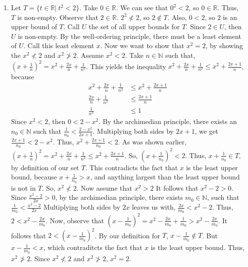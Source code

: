 \documentclass{article}
\theoremstyle{problem}
\theoremstyle{plain}
\theoremstyle{remark}
\begin{document}
\begin{enumerate}
\item %
  Let $T = \{t \in \mathbb{R}|\ t^2 < 2\}$.
  Take $0 \in \mathbb{R}$. 
  We can see that $0^2 < 2$, so $0 \in \mathbb{R}$. 
  Thus, $T$ is non-empty.
  Observe that $2 \in \mathbb{R}$.
  $2^2 \not < 2$, so $2 \not \in T$.
  Also, $0 < 2$, so $2$ is an upper bound of $T$. 
  Call $U$ the set of all upper bounds for $T$.
  Since $2 \in U$, then $U$ is non-empty.
  By the well-ordering principle, there must be a least element of $U$.
  Call this least element $x$.
  Now we want to show that $x^2 = 2$, by showing the $x^2 \not < 2$ and $x^2 \not > 2$.
  Assume $x^2 < 2$.
  Take $n \in \mathbb{N}$ such that, $(x + \frac{1}{n})^2 = x^2 + \frac{2x}{n} + \frac{1}{n^2}$.
  This yields the inequality $x^2 + \frac{2x}{n} + \frac{1}{n^2} \leq x^2 + \frac{2x+1}{n}$, because
  \begin{align*}
    x^2 + \frac{2x}{n} + \frac{1}{n^2} &\leq x^2 + \frac{2x+1}{n}\\
    \frac{2x}{n} + \frac{1}{n^2} &\leq \frac{2x+1}{n}\\
    \frac{1}{n^2} &\leq 1
  \end{align*}  
  Since $x^2 < 2$, then $0 < 2 - x^2$.
  By the archimedian principle, there exists an $n_0 \in \mathbb{N}$ such that $\frac{1}{n_0} < \frac{2 - x^2}{2x+1}$.
  Multiplying both sides by $2x+1$, we get $\frac{2x + 1}{n_0} < 2 - x^2$.
  Thus, $x^2 + \frac{2x+1}{n_0} < 2$.
  As was shown earlier, $(x + \frac{1}{n})^2 = x^2 + \frac{2x}{n} + \frac{1}{n^2} \leq x^2 + \frac{2x + 1}{n}$.
  So, $(x + \frac{1}{n_0})^2 < 2$.
  Thus, $x + \frac{1}{n_0} \in T$, by definition of our set $T$.
  This contradicts the fact that $x$ is the least upper bound, because $x + \frac{1}{n_0} > x$, and anything largest than the least upper bound is not in $T$. 
  So, $x^2 \not < 2$.
  Now assume that $x^2 > 2$
  It follows that $x^2 - 2 > 0$.
  Since $\frac{x^2 - 2}{2x} > 0$, by the archimedian principle, there exists $m_0 \in \mathbb{N}$, such that $\frac{1}{m_0} < \frac{x^2 - 2}{2x}$
  Multiplying both sides by $2x$ leaves us with, $\frac{2x}{m_0} < x^2 - 2$.
  Thus, $2 < x^2 - \frac{2x}{m_0}$.
  Now, observe that $(x - \frac{1}{m_0})^2 = x^2 - \frac{2x}{m_0} + \frac{1}{m_0} > x^2 - \frac{2x}{m_0}.$
  It follows that $2 < (x - \frac{1}{m_0})^2$.
  By our definition for $T$, $x - \frac{1}{m_0} \not \in T$. But $x - \frac{1}{m_0} < x$, which contraditcts the fact that $x$ is the least upper bound.
  Thus, $x^2 \not > 2$.  
  Since $x^2 \not < 2$ and $x^2 \not > 2$, $x^2 = 2$.
  
\end{enumerate}
\end{document}
